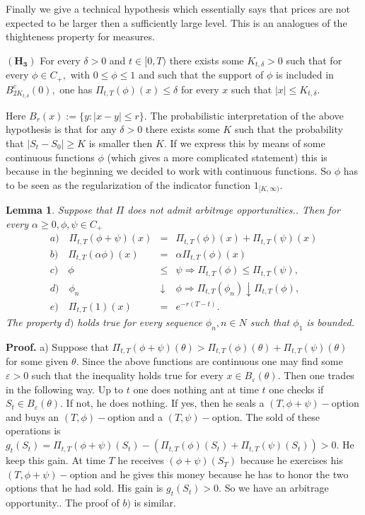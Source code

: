 \documentclass[a4paper]{article}
\newtheorem{lemma}{Lemma}[section]
\begin{document}
Finally we give a technical hypothesis which essentially says that prices
are not expected to be larger then a sufficiently large level. This is an
analogues of the thighteness property for measures.

$\mathbf{(H_{3})}$ For every $\delta >0$ and $t\in [0,T)$ there exists some $%
K_{t,\delta }>0$ such that for every $\phi \in C_{+},$ with $0\leq \phi \leq
1$ and such that the support of $\phi $ is included in $B_{2K_{t,\delta
}}^{c}(0),$ one has $\Pi _{t,T}(\phi )(x)\leq \delta $ for every $x$ such
that $\left| x\right| \leq K_{t,\delta }.$

Here $B_{r}(x):=\{y:\left| x-y\right| \leq r\}.$ The probabilistic
interpretation \hspace{0pt}of the above hypothesis is that for any $\delta
>0 $ there exists some $K$ such that the probability that $\left|
S_{t}-S_{0}\right| \geq K$ is smaller then $K.$ If we express this
by means of some continuous functions $\phi $ (which gives a more
complicated statement) this is because in the beginning we decided
to work with continuous functions. So $\phi $ has to be seen as
the regularization of the indicator function $1_{[K,\infty )}.$

\begin{lemma}
Suppose that $\Pi $ does not admit arbitrage opportunities.. Then for every $%
\alpha \geq 0,\phi ,\psi \in C_{+}$
\begin{eqnarray*}
a)\quad \Pi _{t,T}(\phi +\psi )(x) &=&\Pi _{t,T}(\phi )(x)+\Pi _{t,T}(\psi
)(x) \\
b)\quad \Pi _{t,T}(\alpha \phi )(x) &=&\alpha \Pi _{t,T}(\phi )(x) \\
c)\quad \phi &\leq &\psi \Rightarrow \Pi _{t,T}(\phi )\leq \Pi _{t,T}(\psi ),
\\
d)\quad \phi _{n} &\downarrow &\phi \Rightarrow \Pi _{t,T}(\phi
_{n})\downarrow \Pi _{t,T}(\phi ), \\
e)\quad \Pi _{t,T}(1)(x) &=&e^{-r(T-t)}.\quad
\end{eqnarray*}
The property $d)$ holds true for every sequence $\phi _{n},n\in N$ such that
$\phi _{1}$ is bounded.
\end{lemma}

\textbf{Proof.} a) Suppose that $\Pi _{t,T}(\phi +\psi )(\theta )>\Pi
_{t,T}(\phi )(\theta )+\Pi _{t,T}(\psi )(\theta )$ for some given $\theta .$
Since the above functions are continuous one may find some $\varepsilon >0$
such that the inequality holds true for every $x\in B_{\varepsilon }(\theta
).$ Then one trades in the following way. Up to $t$ one does nothing ant at
time $t$ one checks if $S_{t}\in B_{\varepsilon }(\theta )$. If not, he does
nothing. If yes, then he seals a $(T,\phi +\psi )-$option and buys an $%
(T,\phi )-$option and a $(T,\psi )-$option. The sold of these operations is $%
g_{t}(S_{t})=\Pi _{t,T}(\phi +\psi )(S_{t})-(\Pi _{t,T}(\phi )(S_{t})+\Pi
_{t,T}(\psi )(S_{t}))>0.$ He keep this gain. At time $T$ he receives $(\phi
+\psi )(S_{T})$ because he exercises his $(T,\phi +\psi )-$option and he
gives this money because he has to honor the two options that he had sold.
His gain is $g_{t}(S_{t})>0.$ So we have an arbitrage opportunity.. The
proof of $b)$ is similar.
\end{document}
